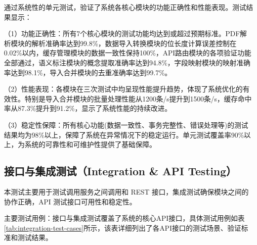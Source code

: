 \begin{table}[H]
    \centering
\caption{导入合并模块单元测试结果}
\label{tab:import-merge-test}
\end{table}

通过系统性的单元测试，验证了系统各核心模块的功能正确性和性能表现。测试结果显示：

（1）功能正确性：所有7个核心模块的测试功能均达到或超过预期标准。PDF解析模块的解析准确率达到99.8\%，数据导入转换模块的位长度计算误差控制在0.02\%以内，缓存管理模块的数据一致性保持100\%，API路由模块的各项验证功能全部通过，语义标注模块的概念提取准确率达到94.8\%，字段映射模块的映射准确率达到98.1\%，导入合并模块的去重准确率达到99.7\%。

（2）性能表现：各模块在三次测试中均呈现性能提升趋势，体现了系统优化的有效性。特别是导入合并模块的批量处理性能从1200条/s提升到1500条/s，缓存命中率从87.3\%提升到91.2\%，显示了系统性能的持续改进。

（3）稳定性保障：所有核心功能(数据一致性、事务完整性、错误处理等)的测试结果均为98\%以上，保障了系统在异常情况下的稳定运行。单元测试覆盖率90\%以上，为系统的可靠性和可维护性提供了基础保障。


\subsection{接口与集成测试（Integration \& API Testing）}

本测试主要用于测试调用服务之间调用和 REST 接口，集成测试确保模块之间的协作正确，API 测试接口可用性和稳定性。


主要测试用例：接口与集成测试覆盖了系统的核心API接口，具体测试用例如表\ref{tab:integration-test-cases}所示，该表详细列出了各API接口的测试场景、验证标准和测试结果。

